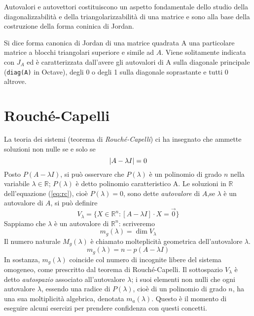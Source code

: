 Autovalori e autovettori costituiscono un aspetto fondamentale dello studio della
diagonalizzabilità e della triangolarizzabilità di una matrice e sono alla base
della costruzione della forma coninica di Jordan.
\begin{defi}
  Si dice forma canonica di Jordan di una matrice quadrata A una particolare matrice a
  blocchi triangolari superiore e simile ad $A$. Viene solitamente indicata con $J_A$ ed
  è caratterizzata dall'avere gli autovalori di A sulla diagonale principale
  (\lstinline|diag(A)| in Octave), degli 0 o degli 1 sulla diagonale soprastante e tutti
  0 altrove. 
\end{defi}

\section{Rouché-Capelli}
\label{sec:rouche-capelli}
La teoria dei sistemi (teorema di \textit{Rouché-Capelli}) ci ha insegnato che ammette
soluzioni non nulle se e solo se
\begin{equation}
  \label{eq:rc}
  \lvert A-\lambda I\rvert=0
\end{equation}
Posto $P(A-\lambda I)$, si può osservare che $P(\lambda)$ è un polinomio di grado $n$ nella variabile $\lambda \in \mathds{R}$; $P(\lambda)$ 
è detto polinomio caratteristico A. Le soluzioni in $\mathds{R}$ dell'equazione (\ref{eq:rc}), cioè $P(\lambda)=0$, sono dette \textit{autovalore}
di $A$,se $\lambda$ è un autovalore di $A$, si può definire
\begin{equation*}
  V_\lambda =\{X\in\mathds{R}^n:[A-\lambda I]\cdot X=\vec{0}\}
\end{equation*}
Sappiamo che $\lambda$ è un autovalore di $\mathds{R}^n$: scriveremo
\begin{equation*}
  m_g(\lambda)=\dim V_\lambda
\end{equation*}
Il numero naturale $M_g(\lambda)$ è chiamato molteplicità geometrica dell'autovalore $\lambda$.
\begin{equation*}
  m_g(\lambda)=n-p(A-\lambda I)
\end{equation*}
In sostanza, $m_g(\lambda)$ coincide col numero di incognite libere del sistema omogeneo, come prescritto dal teorema di Rouché-Capelli. Il sottospazio
$V_\lambda$ è detto \textit{autospazio} associato all'autovalore $\lambda$; i suoi elementi non nulli che ogni autovalore $\lambda$, essendo una radice
di $P(\lambda)$, cioè di un polinomio di grado $n$, ha una sua moltiplicità algebrica, denotata $m_a(\lambda)$. Questo è il momento di eseguire alcuni
esercizi per prendere confidenza con questi concetti.

